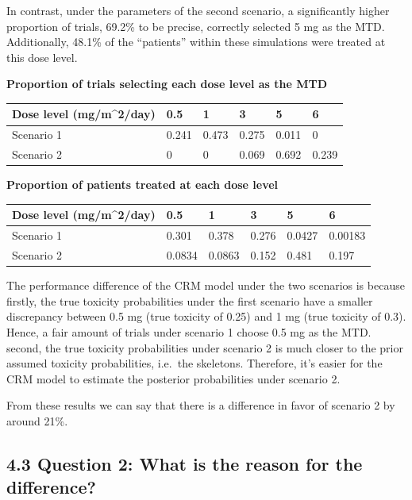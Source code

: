 \documentclass[
]{article}
\begin{document}
In contrast, under the parameters of the second scenario, a
significantly higher proportion of trials, 69.2\% to be precise,
correctly selected 5 mg as the MTD. Additionally, 48.1\% of the
``patients'' within these simulations were treated at this dose level.

\textbf{Proportion of trials selecting each dose level as the MTD}

\begin{longtable}[]{@{}llllll@{}}
\toprule()
Dose level (mg/m\^{}2/day) & 0.5 & 1 & 3 & 5 & 6 \\
\midrule()
\endhead
Scenario 1 & 0.241 & 0.473 & 0.275 & 0.011 & 0 \\
Scenario 2 & 0 & 0 & 0.069 & 0.692 & 0.239 \\
\bottomrule()
\end{longtable}

\textbf{Proportion of patients treated at each dose level}

\begin{longtable}[]{@{}llllll@{}}
\toprule()
Dose level (mg/m\^{}2/day) & 0.5 & 1 & 3 & 5 & 6 \\
\midrule()
\endhead
Scenario 1 & 0.301 & 0.378 & 0.276 & 0.0427 & 0.00183 \\
Scenario 2 & 0.0834 & 0.0863 & 0.152 & 0.481 & 0.197 \\
\bottomrule()
\end{longtable}

The performance difference of the CRM model under the two scenarios is
because firstly, the true toxicity probabilities under the first
scenario have a smaller discrepancy between 0.5 mg (true toxicity of
0.25) and 1 mg (true toxicity of 0.3). Hence, a fair amount of trials
under scenario 1 choose 0.5 mg as the MTD. second, the true toxicity
probabilities under scenario 2 is much closer to the prior assumed
toxicity probabilities, i.e.~the skeletons. Therefore, it's easier for
the CRM model to estimate the posterior probabilities under scenario 2.

From these results we can say that there is a difference in favor of
scenario 2 by around 21\%.

\hypertarget{question-2-what-is-the-reason-for-the-difference}{%
\subsection{4.3 Question 2: What is the reason for the
difference?}\label{question-2-what-is-the-reason-for-the-difference}}
\end{document}

